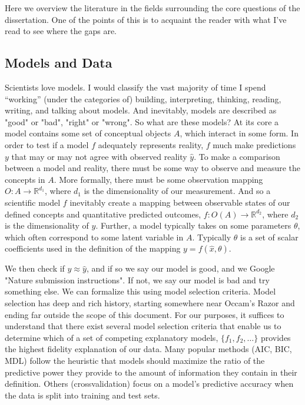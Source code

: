 \documentclass[]{article}
\begin{document}
Here we overview the literature in the fields surrounding the core questions of the dissertation. One of the points of this is to acquaint the reader with what I've read to see where the gaps are.

\hypertarget{models-and-data}{%
\subsection{Models and Data}\label{models-and-data}}

Scientists love models. I would classify the vast majority of time I
spend ``working'' (under the categories of) building, interpreting,
thinking, reading, writing, and talking about models. And inevitably,
models are described as "good" or "bad", "right" or "wrong". So
what are these models? At its core a model contains some set of
conceptual objects \(A\), which interact in some form. In order to test
if a model \(f\) adequately represents reality, \(f\) much make
predictions \(y\) that may or may not agree with observed reality
\(\hat{y}\). To make a comparison between a model and reality, there
must be some way to observe and measure the concepts in \(A\). More
formally, there must be some observation mapping
\(O: A \to \mathbb{R}^{d_1}\), where \(d_1\) is the dimensionality of
our measurement. And so a scientific model \(f\) inevitably create a
mapping between observable states of our defined concepts and
quantitative predicted outcomes, \(f : O(A) \to \mathbb{R}^{d_2}\),
where \(d_2\) is the dimensionality of \(y\). Further, a model typically
takes on some parameters \(\theta\), which often correspond to some
latent variable in \(A\). Typically \(\theta\) is a set of scalar
coefficients used in the definition of the mapping
\(y = f(\hat{x}, \theta)\).

We then check if \(y \approx \hat{y}\), and if so we say our model is
good, and we Google "Nature submission instructions". If not, we say
our model is bad and try something else. We can formalize this using
model selection criteria. Model selection has deep and rich history,
starting somewhere near Occam's Razor and ending far outside the
scope of this document. For our purposes, it suffices to understand that
there exist several model selection criteria that enable us to determine
which of a set of competing explanatory models, \(\{f_1, f_2, \dots\}\)
provides the highest fidelity explanation of our data. Many popular
methods (AIC, BIC, MDL) follow the heuristic that models should maximize
the ratio of the predictive power they provide to the amount of
information they contain in their definition. Others (crossvalidation)
focus on a model's predictive accuracy when the data is split into
training and test sets.
\end{document}
